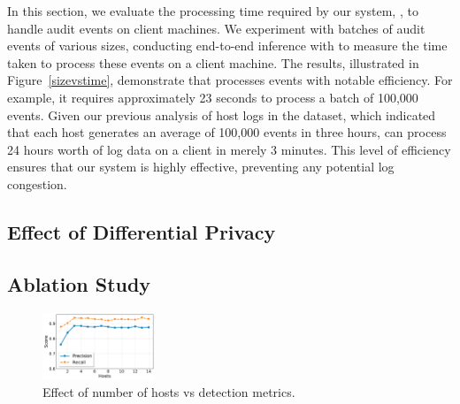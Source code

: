  In this section, we evaluate the processing time required by our system, \Sys, to handle audit events on client machines. We experiment with batches of audit events of various sizes, conducting end-to-end inference with \Sys to measure the time taken to process these events on a client machine. The results, illustrated in Figure~\ref{sizevstime}, demonstrate that \Sys processes events with notable efficiency. For example, it requires approximately 23 seconds to process a batch of 100,000 events. Given our previous analysis of host logs in the \optc dataset, which indicated that each host generates an average of 100,000 events in three hours, \Sys can process 24 hours worth of log data on a client in merely 3 minutes. This level of efficiency ensures that our system is highly effective, preventing any potential log congestion.

 \subsection*{Effect of Differential Privacy}

 \subsection*{Ablation Study}



\begin{figure}[t!]
  \centering
  \includegraphics[width=0.3\textwidth]{fig/scoresvshosts.pdf}
  \caption{Effect of number of hosts vs detection metrics.}
  \label{scoresvshosts}
  \vspace{-2ex}
\end{figure}



